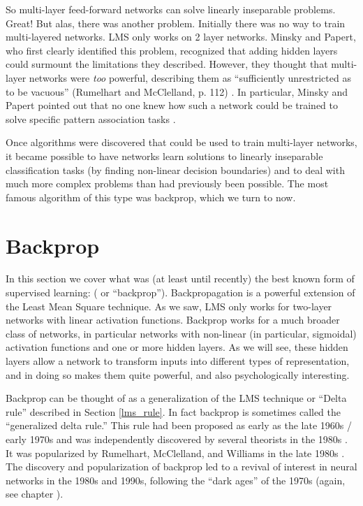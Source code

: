 So multi-layer feed-forward networks can solve linearly inseparable problems. Great!  But alas, there was another  problem. Initially there was no way to train multi-layered networks. LMS only works on 2 layer networks. Minsky and Papert, who first clearly identified this problem, recognized that adding hidden layers could surmount the limitations they described. However, they thought that multi-layer networks were {\em too} powerful, describing them as ``sufficiently unrestricted as to be vacuous'' (Rumelhart and McClelland, p. 112) \cite{rumelhart1986parallel}. In particular, Minsky and Papert pointed out that no one knew how such a network could be trained to solve specific pattern association tasks \cite{minsky1969perceptrons}.

Once algorithms were discovered that could be used to train multi-layer networks, it became possible to have networks learn solutions to linearly inseparable classification tasks (by finding non-linear decision boundaries) and to deal with much more complex problems than had previously been possible. The most famous algorithm of this type was backprop, which we turn to now.

\section{Backprop}\label{backprop}

In this section we cover what was (at least until recently) the best known form of supervised learning:  ( or ``backprop''). Backpropagation is a powerful extension of the Least Mean Square  technique. As we saw, LMS only works for two-layer networks with linear activation functions. Backprop works for a much broader class of networks, in particular networks with non-linear (in particular, sigmoidal) activation functions and one or more hidden layers. As we will see, these hidden layers allow a network to transform inputs into different types of representation, and in doing so makes them quite powerful, and also psychologically interesting. 

Backprop can be thought of as a generalization of the LMS technique or ``Delta rule'' described in Section \ref{lms_rule}. In fact backprop is sometimes called the ``generalized delta rule.'' This rule had been proposed as early as the late 1960s / early 1970s \cite{bryson1969applied, werbos1974beyond} and was independently discovered by several theorists in the 1980s \cite{le1986learning, parker1985learning}. It was popularized by Rumelhart, McClelland, and Williams in the late 1980s \cite{rumelhart1986parallel}. The discovery and popularization of backprop led to a revival of interest in neural networks in the 1980s and 1990s, following the ``dark ages'' of the 1970s (again, see chapter ).

